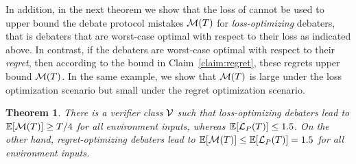 \documentclass[11pt,letterpaper]{article}
\newtheorem{theorem}{Theorem}
\theoremstyle{definition}
\theoremstyle{plain}
\begin{document}
In addition, in the next theorem we show that the loss of \dt cannot be used to upper bound the debate protocol mistakes ${\mathcal M}(T)$ for \emph{loss-optimizing} debaters, that is debaters that are worst-case optimal with respect to their loss as indicated above. In contrast, if the debaters are worst-case optimal with respect to their \emph{regret}, then according to the bound in Claim~\ref{claim:regret}, these regrets upper bound ${\mathcal M}(T)$. In the same example, we show that ${\mathcal M}(T)$ is large under the loss optimization scenario but small under the regret optimization scenario. 
\begin{theorem}
    There is a verifier class ${\mathcal V}$ such that loss-optimizing debaters lead to 
    $\mathbb{E}[{\mathcal M}(T)] \geq T/4$ for all environment inputs, whereas $\mathbb{E}[{{\mathcal L}_P}(T)] \leq 1.5$. On the other hand, regret-optimizing debaters lead to $\mathbb{E}[{\mathcal M}(T)] \leq \mathbb{E}[{{\mathcal L}_P}(T)] = 1.5$ for all environment inputs.
\end{theorem}
\end{document}
